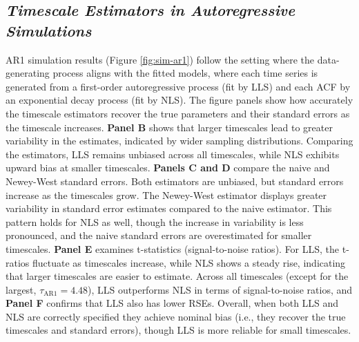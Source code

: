 \documentclass[latex/main.tex]{subfiles}
\begin{document}
\subsection{\textit{Timescale Estimators in Autoregressive Simulations}}

AR1 simulation results (Figure \ref{fig:sim-ar1}) follow the setting where the data-generating process aligns with the fitted models, where each time series is generated from a first-order autoregressive process (fit by LLS) and each ACF by an exponential decay process (fit by NLS). The figure panels show how accurately the timescale estimators recover the true parameters and their standard errors as the timescale increases. \textbf{Panel B} shows that larger timescales lead to greater variability in the estimates, indicated by wider sampling distributions. Comparing the estimators, LLS remains unbiased across all timescales, while NLS exhibits upward bias at smaller timescales. \textbf{Panels C and D} compare the naive and Newey-West standard errors. Both estimators are unbiased, but standard errors increase as the timescales grow. The Newey-West estimator displays greater variability in standard error estimates compared to the naive estimator. This pattern holds for NLS as well, though the increase in variability is less pronounced, and the naive standard errors are overestimated for smaller timescales. \textbf{Panel E} examines t-statistics (signal-to-noise ratios). For LLS, the t-ratios fluctuate as timescales increase, while NLS shows a steady rise, indicating that larger timescales are easier to estimate. Across all timescales (except for the largest, $\tau_\text{AR1} = 4.48$), LLS outperforms NLS in terms of signal-to-noise ratios, and \textbf{Panel F} confirms that LLS also has lower RSEs. Overall, when both LLS and NLS are correctly specified they achieve nominal bias (i.e., they recover the true timescales and standard errors), though LLS is more reliable for small timescales.\\
\end{document}
